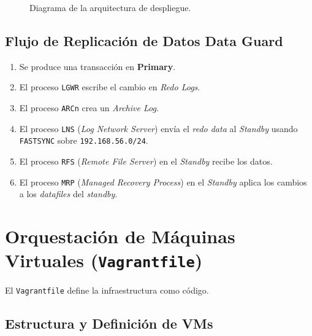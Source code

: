 \documentclass[11pt, a4paper]{report}
\begin{document}
\begin{figure}[H]
  \caption{Diagrama de la arquitectura de despliegue.}
  \label{fig:arquitectura_tikz}
\end{figure}

\subsection{Flujo de Replicación de Datos Data Guard}

\begin{enumerate}
    \item Se produce una transacción en \textbf{Primary}.
\item El proceso \texttt{LGWR} escribe el cambio en \textit{Redo Logs}.
    \item El proceso \texttt{ARCn} crea un \textit{Archive Log}.
\item El proceso \texttt{LNS} (\textit{Log Network Server}) envía el \textit{redo data} al \textit{Standby} usando \texttt{FASTSYNC} sobre \texttt{192.168.56.0/24}.
\item El proceso \texttt{RFS} (\textit{Remote File Server}) en el \textit{Standby} recibe los datos.
\item El proceso \texttt{MRP} (\textit{Managed Recovery Process}) en el \textit{Standby} aplica los cambios a los \textit{datafiles} del \textit{standby}.
\end{enumerate}

\section{Orquestación de Máquinas Virtuales (\texttt{Vagrantfile})}

El \texttt{Vagrantfile} define la infraestructura como código.
\subsection{Estructura y Definición de VMs}
\end{document}
